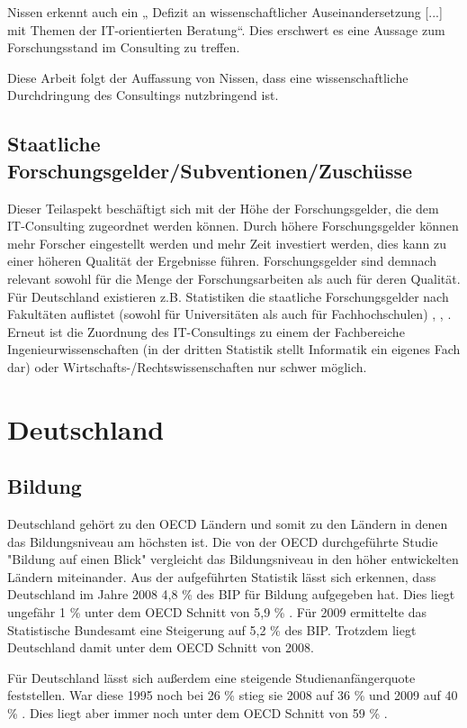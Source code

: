 Nissen erkennt auch ein „ Defizit an wissenschaftlicher Auseinandersetzung [...] mit Themen der IT-orientierten Beratung“. Dies erschwert es eine Aussage zum Forschungsstand im Consulting zu treffen.

Diese Arbeit folgt der Auffassung von Nissen, dass eine wissenschaftliche Durchdringung des Consultings nutzbringend ist.

\subsection{Staatliche Forschungsgelder/Subventionen/Zuschüsse}
Dieser Teilaspekt beschäftigt sich mit der Höhe der Forschungsgelder, die dem IT-Consulting zugeordnet werden können. Durch höhere Forschungsgelder können mehr Forscher eingestellt werden und mehr Zeit investiert werden, dies kann zu einer höheren Qualität der Ergebnisse führen. Forschungsgelder sind demnach relevant sowohl für die Menge der Forschungsarbeiten als auch für deren Qualität.
Für Deutschland existieren z.B. Statistiken die staatliche Forschungsgelder nach Fakultäten auflistet (sowohl für Universitäten als auch für Fachhochschulen) \cite {ausgabenfakuni}, \cite {ausgabenfakfach}, \cite {ausgabenbmbf}. Erneut ist die Zuordnung des IT-Consultings zu einem der Fachbereiche Ingenieurwissenschaften (in der dritten Statistik stellt Informatik ein eigenes Fach dar) oder Wirtschafts-/Rechtswissenschaften nur schwer möglich.


\section{Deutschland}
\subsection{Bildung}
Deutschland gehört zu den OECD Ländern und somit zu den Ländern in denen das Bildungsniveau am höchsten ist. Die von der OECD durchgeführte Studie "Bildung auf einen Blick" \cite{oecd2} vergleicht das Bildungsniveau in den höher entwickelten Ländern miteinander. Aus der aufgeführten Statistik lässt sich erkennen, dass Deutschland im Jahre 2008 4,8 \% des BIP für Bildung aufgegeben hat. Dies liegt ungefähr 1 \% unter dem OECD Schnitt von 5,9 \% . Für 2009 ermittelte das Statistische Bundesamt eine Steigerung auf 5,2 \% des BIP. Trotzdem liegt Deutschland damit unter dem OECD Schnitt von 2008.

Für Deutschland lässt sich außerdem eine steigende Studienanfängerquote feststellen. War diese 1995 noch bei 26 \%  stieg sie 2008 auf 36 \%  und 2009 auf 40 \% . Dies liegt aber immer noch unter dem OECD Schnitt von 59 \% .

